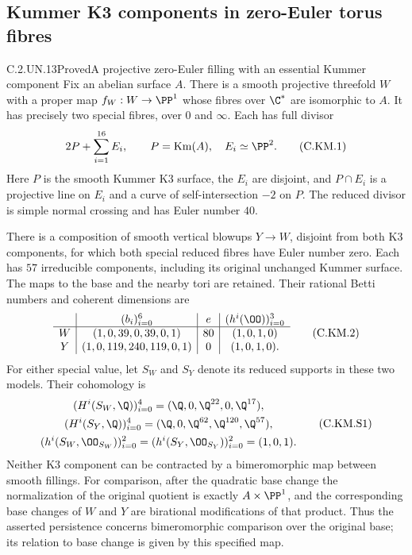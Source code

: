 \subsection{Kummer K3 components in zero-Euler torus fibres}

\begin{statement}{C.2.UN.13}{Proved}{A projective zero-Euler filling with an essential Kummer component}
Fix an abelian surface $A$. There is a smooth projective threefold
$W$ with a proper map $f_W:W\to\PP^1$ whose fibres over
$\C^*$ are isomorphic to $A$. It has precisely two special fibres,
over $0$ and $\infty$. Each has full divisor
\[
               2P+\sum_{i=1}^{16}E_i,\qquad
 P=\operatorname{Km}(A),\quad E_i\simeq\PP^2.       \tag{C.KM.1}
\]
Here $P$ is the smooth Kummer K3 surface, the $E_i$ are disjoint,
and $P\cap E_i$ is a projective line on $E_i$ and a curve of
self-intersection $-2$ on $P$. The reduced divisor is simple
normal crossing and has Euler number $40$.

There is a composition of smooth vertical blowups $Y\to W$,
disjoint from both K3 components, for which both special reduced
fibres have Euler number zero. Each has $57$ irreducible
components, including its original unchanged Kummer surface.
The maps to the base and the nearby tori are retained. Their
rational Betti numbers and coherent dimensions are
\[
 \begin{array}{c|c|c|c}
 & (b_i)_{i=0}^6 & e & (h^i(\OO))_{i=0}^3\\ \hline
 W&(1,0,39,0,39,0,1)&80&(1,0,1,0)\\
 Y&(1,0,119,240,119,0,1)&0&(1,0,1,0).
 \end{array}                                             \tag{C.KM.2}
\]
For either special value, let $S_W$ and $S_Y$ denote its
reduced supports in these two models. Their cohomology is
\[
 \begin{gathered}
 (H^i(S_W,\Q))_{i=0}^4=(\Q,0,\Q^{22},0,\Q^{17}),\\
 (H^i(S_Y,\Q))_{i=0}^4=(\Q,0,\Q^{62},\Q^{120},\Q^{57}),\\
 (h^i(S_W,\OO_{S_W}))_{i=0}^2
   =(h^i(S_Y,\OO_{S_Y}))_{i=0}^2=(1,0,1).
 \end{gathered}                                          \tag{C.KM.S1}
\]
Neither K3 component can be contracted by a bimeromorphic map
between smooth fillings. For comparison, after the quadratic
base change the normalization of the original quotient is
exactly $A\times\PP^1$, and the corresponding base changes
of $W$ and $Y$ are birational modifications of that product.
Thus the asserted persistence concerns bimeromorphic comparison
over the original base; its relation to base change is given
by this specified map.
\end{statement}
